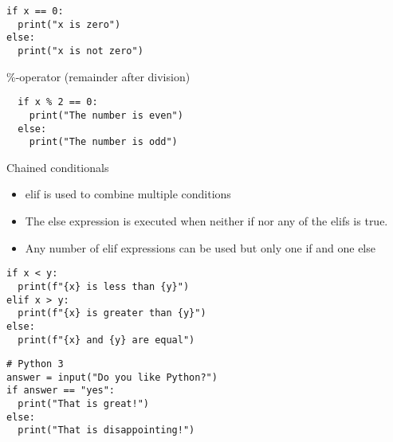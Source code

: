 \documentclass[10pt, a4paper]{beamer} %
\newcommand{\lb}[1]{{\color{mLightBrown}#1}}
\begin{document}
\begin{frame}
	\begin{lstlisting}
if x == 0:
  print("x is zero")
else:
  print("x is not zero")
\end{lstlisting}

	\framebreak

	\begin{examples}
		\begin{block}{\color{mLightBrown}\%-operator (remainder after division)}
			{}
		\end{block}
	\end{examples}
	\begin{lstlisting}
  if x % 2 == 0:
    print("The number is even")
  else:
    print("The number is odd")
\end{lstlisting}

	\framebreak

	\begin{block}{Chained conditionals}
		\begin{itemize}
			\item \lb{elif} is used to combine multiple conditions
			\item The \lb{else} expression is executed when neither \lb{if} nor any of the \lb{elif}s is true.
			\item Any number of \lb{elif} expressions can be used but only one \lb{if} and one \lb{else}
		\end{itemize}
	\end{block}


	\framebreak

	\begin{examples}
		\begin{lstlisting}
if x < y:
  print(f"{x} is less than {y}")
elif x > y:
  print(f"{x} is greater than {y}")
else:
  print(f"{x} and {y} are equal")
\end{lstlisting}
		\begin{lstlisting}
# Python 3
answer = input("Do you like Python?")
if answer == "yes":
  print("That is great!")
else:
  print("That is disappointing!")
\end{lstlisting}
	\end{examples}
\end{frame}
\end{document}

